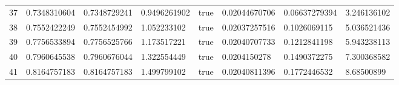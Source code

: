 \begin{tabular}{@{}llllllll@{}}
37 & 0.7348310604 & 0.7348729241 & 0.9496261902 & true & 0.02044670706 & 0.06637279394 & 3.246136102 \\
38 & 0.7552422249 & 0.7552454992 & 1.052233102 & true & 0.02037257516 & 0.1026069115 & 5.036521436 \\
39 & 0.7756533894 & 0.7756525766 & 1.173517221 & true & 0.02040707733 & 0.1212841198 & 5.943238113 \\
40 & 0.7960645538 & 0.7960676044 & 1.322554449 & true & 0.0204150278 & 0.1490372275 & 7.300368582 \\
41 & 0.8164757183 & 0.8164757183 & 1.499799102 & true & 0.02040811396 & 0.1772446532 & 8.68500899 \\
\bottomrule
\end{tabular}
